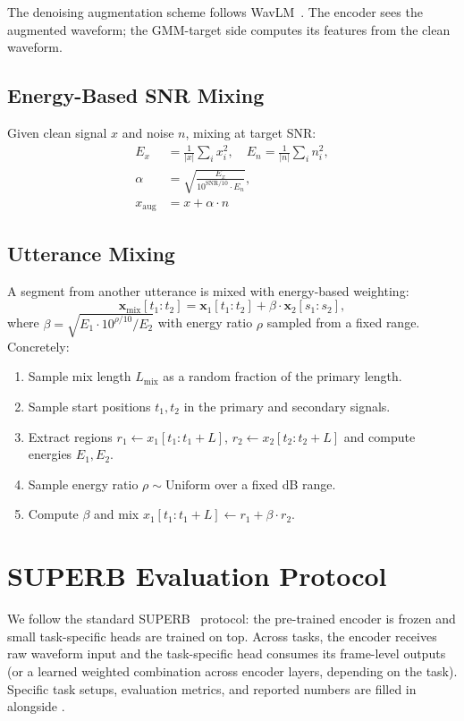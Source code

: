 \documentclass[9pt,twocolumn]{article}
\theoremstyle{plain}
\theoremstyle{definition}
\theoremstyle{remark}
\begin{document}
The denoising augmentation scheme follows WavLM~\citep{chen2022wavlm}. The encoder sees the augmented waveform; the GMM-target side computes its features from the clean waveform.

\subsection{Energy-Based SNR Mixing}

Given clean signal $x$ and noise $n$, mixing at target SNR:
\begin{align}
E_x &= \frac{1}{|x|}\sum_i x_i^2, \quad E_n = \frac{1}{|n|}\sum_i n_i^2, \\
\alpha &= \sqrt{\frac{E_x}{10^{\text{SNR}/10} \cdot E_n}}, \\
x_{\text{aug}} &= x + \alpha \cdot n
\end{align}

\subsection{Utterance Mixing}

A segment from another utterance is mixed with energy-based weighting:
\begin{equation}
\mathbf{x}_{\text{mix}}[t_1:t_2] = \mathbf{x}_1[t_1:t_2] + \beta \cdot \mathbf{x}_2[s_1:s_2],
\end{equation}
where $\beta = \sqrt{E_1 \cdot 10^{\rho/10} / E_2}$ with energy ratio $\rho$ sampled from a fixed range. Concretely:
\begin{enumerate}
    \item Sample mix length $L_{\text{mix}}$ as a random fraction of the primary length.
    \item Sample start positions $t_1, t_2$ in the primary and secondary signals.
    \item Extract regions $r_1 \gets x_1[t_1:t_1+L]$, $r_2 \gets x_2[t_2:t_2+L]$ and compute energies $E_1, E_2$.
    \item Sample energy ratio $\rho \sim \text{Uniform}$ over a fixed dB range.
    \item Compute $\beta$ and mix $x_1[t_1:t_1+L] \gets r_1 + \beta \cdot r_2$.
\end{enumerate}

\section{SUPERB Evaluation Protocol}
\label{app:superb}

We follow the standard SUPERB~\citep{yang2021superbspeechprocessinguniversal} protocol: the pre-trained encoder is frozen and small task-specific heads are trained on top. Across tasks, the encoder receives raw waveform input and the task-specific head consumes its frame-level outputs (or a learned weighted combination across encoder layers, depending on the task). Specific task setups, evaluation metrics, and reported numbers are filled in alongside .
\end{document}
